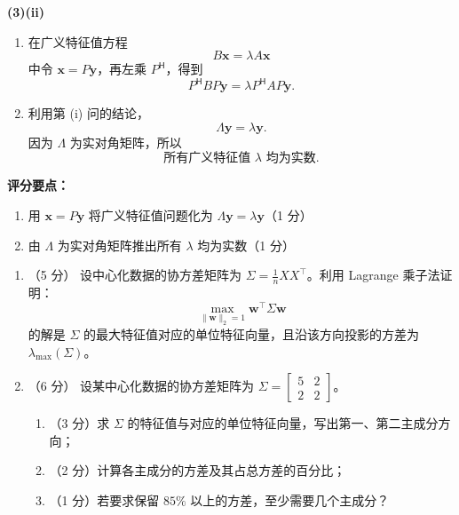 \documentclass[10pt,a4paper]{exam-zh}
\newcommand{\bvec}[1]{\boldsymbol{#1}}
\newcommand{\ct}{\mathsf{H}}
\newenvironment{grading}
  {\par\smallskip\Needspace{5\baselineskip}\small
   \noindent\textcolor{gradingred}{\textbf{评分要点：}}
   \begin{enumerate}[label=\textcolor{gradingred}{\arabic*.},
     leftmargin=2.4em,itemsep=0pt,topsep=2pt,parsep=0pt]}
  {\end{enumerate}\smallskip}
\newcommand{\gradeitem}[2]{\item #1（\textcolor{gradingred}{#2 分}）}
\newenvironment{answersteps}
  {\begin{enumerate}[label=\textbf{步骤 \arabic*.},
    leftmargin=4.8em,labelsep=0.6em,itemsep=2pt,topsep=3pt,parsep=0pt]}
  {\end{enumerate}}
\newcommand{\subanswer}[1]{%
  \par\medskip\Needspace{6\baselineskip}\noindent\textbf{#1}\par}
\begin{document}
\begin{solution}
\subanswer{(3)(ii)}
\begin{answersteps}
  \item 在广义特征值方程
  \[
  B\bvec x=\lambda A\bvec x
  \]
  中令 $\bvec x=P\bvec y$，再左乘 $P^\ct$，得到
  \[
  P^\ct BP\bvec y
  =\lambda P^\ct AP\bvec y.
  \]
  \item 利用第 (i) 问的结论，
  \[
  \Lambda\bvec y=\lambda\bvec y.
  \]
  因为 $\Lambda$ 为实对角矩阵，所以
  \[
  \boxed{\text{所有广义特征值 }\lambda\text{ 均为实数}}.
  \]
\end{answersteps}
\begin{grading}
  \gradeitem{用 $\bvec x=P\bvec y$ 将广义特征值问题化为
  $\Lambda\bvec y=\lambda\bvec y$}{1}
  \gradeitem{由 $\Lambda$ 为实对角矩阵推出所有 $\lambda$ 均为实数}{1}
\end{grading}
\end{solution}


\begin{problem}[points = 11]

\begin{enumerate}
    \item （5 分） 设中心化数据的协方差矩阵为 $\Sigma=\frac1nXX^\top$。利用 Lagrange 乘子法证明：
    \[
      \max_{\|\bvec{w}\|_2=1}\bvec{w}^\top\Sigma\bvec{w}
    \]
    的解是 $\Sigma$ 的最大特征值对应的单位特征向量，且沿该方向投影的方差为 $\lambda_{\max}(\Sigma)$。

    \item （6 分） 设某中心化数据的协方差矩阵为
    $\Sigma=\begin{bmatrix}5&2\\2&2\end{bmatrix}$。
    \begin{enumerate}
        \item （3 分）求 $\Sigma$ 的特征值与对应的单位特征向量，写出第一、第二主成分方向；
        \item （2 分）计算各主成分的方差及其占总方差的百分比；
        \item （1 分）若要求保留 $85\%$ 以上的方差，至少需要几个主成分？
    \end{enumerate}
\end{enumerate}
\end{problem}
\end{document}
